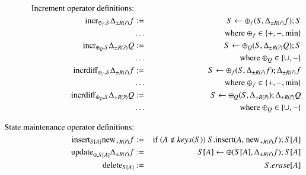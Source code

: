 \documentclass{article}
\begin{document}
%
%
\begin{figure*}
\begin{eqnarray}
\mbox{Increment operator definitions:} && \nonumber\\
\label{eq:incr1}
\algincr_{\oplus_f, S} \Delta_{\pm R(\vec{r})} f &:=& S \leftarrow
\oplus_f(S, \Delta_{\pm R(\vec{r})} f); S
\\
\nonumber &\dots& \mbox{where $\oplus_f \in \{+,-,\min\}$}
\\
\label{eq:incr2}
\algincr_{\oplus_Q, S} \Delta_{\pm R(\vec{r})} Q &:=& S \leftarrow
\oplus_Q(S, \Delta_{\pm R(\vec{r})} Q); S
\\
\nonumber &\dots& \mbox{where $\oplus_Q \in \{\cup, -\}$}
\\
%
%
\label{eq:incr3}
\algincrdiff_{\oplus_f, S} \Delta_{\pm R(\vec{r})} f &:=&
S \leftarrow \oplus_f(S, \Delta_{\pm R(\vec{r})} f); \Delta_{\pm R(\vec{r})} f
\\
\nonumber &\dots& \mbox{where $\oplus_f \in \{+, -,\min\}$}
\\
\label{eq:incr4}
\algincrdiff_{\oplus_Q, S} \Delta_{\pm R(\vec{r})} Q &:=&
S \leftarrow \oplus_Q(S, \Delta_{\pm R(\vec{r})}); \Delta_{\pm R(\vec{r})} Q
\\
\nonumber &\dots& \mbox{where $\oplus_Q \in \{\cup, -\}$}
%
%
\\[2ex]
\mbox{State maintenance operator definitions:} && \nonumber
\\
\label{eq:sm1}
\alginsert_{S[A]} \algnew_{+R(\vec{r})} f
&:=&
\mbox{if ($A \notin keys(S)$) $S$.insert($A$,  $\algnew_{+R(\vec{r})} f$)};
S[A]
\\
\label{eq:sm2}
\algupdate_{\oplus, S[A]} \Delta_{\pm R(\vec{r})} f
&:=&
S[A] \leftarrow \oplus(S[A], \Delta_{\pm R(\vec{r})} f);
S[A]
\\
\label{eq:sm3}
\algdelete_{S[A]}
&:=&
S.erase[A]
\end{eqnarray}
\end{figure*}
\end{document}
